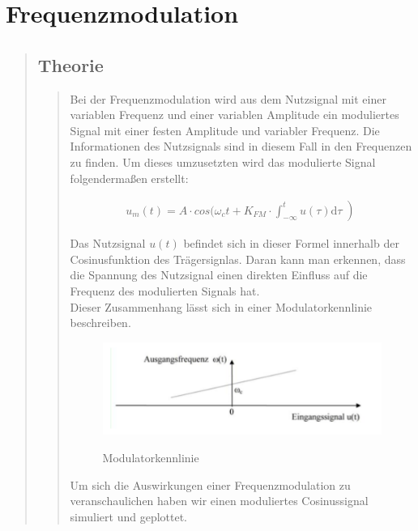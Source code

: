 \section{Frequenzmodulation}
\begin{quote}
    \subsection{Theorie}
    \begin{quote}
        Bei der Frequenzmodulation wird aus dem Nutzsignal mit einer variablen Frequenz und einer variablen Amplitude
        ein moduliertes Signal mit einer festen Amplitude und variabler Frequenz. Die Informationen des Nutzsignals sind
        in diesem Fall in den Frequenzen zu finden. Um dieses umzusetzten wird das modulierte Signal folgendermaßen
        erstellt:
        
        \begin{equation*}
        	\begin{split}
        		u_m (t) = A \cdot cos ( \omega_c t + K_{FM} \cdot \int_{-\infty}^{t} u(\tau) \mathrm d\tau \left)
        	\end{split}
        \end{equation*}
        
        Das Nutzsignal $u(t)$ befindet sich in dieser Formel innerhalb der Cosinusfunktion des Trägersignlas. Daran
        kann man erkennen, dass die Spannung des Nutzsignal einen direkten Einfluss auf die Frequenz des modulierten
        Signals hat.\\
        Dieser Zusammenhang lässt sich  in einer Modulatorkennlinie beschreiben.
        
        \begin{figure}[H]
        \centering
            \includegraphics[scale=0.7, trim = 0cm 0cm 0cm 0cm, clip]{./Bilder/Modulatorkennlinie}
                \caption{Modulatorkennlinie}
                \cite{Modulatorkennlinie}
        \end{figure}
    
        Um sich die Auswirkungen einer Frequenzmodulation zu veranschaulichen haben wir einen moduliertes Cosinussignal
        simuliert und geplottet.
        

\end{quote}
\end{quote}
